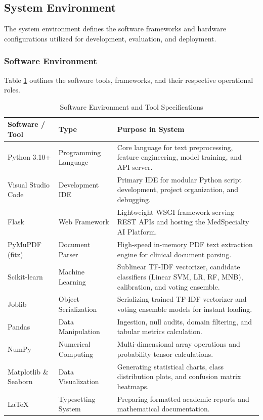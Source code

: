 \subsection{System Environment}

The system environment defines the software frameworks and hardware configurations utilized for development, evaluation, and deployment.

\subsubsection{Software Environment}
Table \ref{tab:software_environment} outlines the software tools, frameworks, and their respective operational roles.

\begin{table}[H]
\centering
\small
\renewcommand{\arraystretch}{1.15}
\setlength{\tabcolsep}{5pt}
\begin{tabularx}{\linewidth}{|>{\raggedright\arraybackslash}p{3.2cm}|>{\raggedright\arraybackslash}p{3.0cm}|>{\raggedright\arraybackslash}X|}
\hline
\textbf{Software / Tool} & \textbf{Type} & \textbf{Purpose in System} \\
\hline
Python 3.10+ & Programming Language & Core language for text preprocessing, feature engineering, model training, and API server. \\
\hline
Visual Studio Code & Development IDE & Primary IDE for modular Python script development, project organization, and debugging. \\
\hline
Flask & Web Framework & Lightweight WSGI framework serving REST APIs and hosting the MedSpecialty AI Platform. \\
\hline
PyMuPDF (fitz) & Document Parser & High-speed in-memory PDF text extraction engine for clinical document parsing. \\
\hline
Scikit-learn & Machine Learning & Sublinear TF-IDF vectorizer, candidate classifiers (Linear SVM, LR, RF, MNB), calibration, and voting ensemble. \\
\hline
Joblib & Object Serialization & Serializing trained TF-IDF vectorizer and voting ensemble models for instant loading. \\
\hline
Pandas & Data Manipulation & Ingestion, null audits, domain filtering, and tabular metrics calculation. \\
\hline
NumPy & Numerical Computing & Multi-dimensional array operations and probability tensor calculations. \\
\hline
Matplotlib \& Seaborn & Data Visualization & Generating statistical charts, class distribution plots, and confusion matrix heatmaps. \\
\hline
\LaTeX & Typesetting System & Preparing formatted academic reports and mathematical documentation. \\
\hline
\end{tabularx}
\caption{Software Environment and Tool Specifications}
\label{tab:software_environment}
\end{table}

